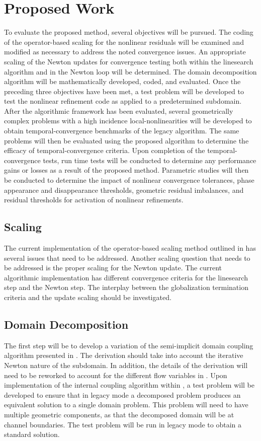 \chapter{Proposed Work}
\label{chap:proposal}
To evaluate the proposed method, several objectives will be pursued.
The coding of the operator-based scaling for the nonlinear residuals will be examined and modified as necessary to address the noted convergence issues.
An appropriate scaling of the Newton updates for convergence testing both within the linesearch algorithm and in the Newton loop will be determined.
The domain decomposition algorithm will be mathematically developed, coded, and evaluated.
Once the preceding three objectives have been met, a test problem will be developed to test the nonlinear refinement code as applied to a predetermined subdomain.
After the algorithmic framework has been evaluated, several geometrically complex problems with a high incidence local-nonlinearities will be developed to obtain temporal-convergence benchmarks of the legacy algorithm.
The same problems will then be evaluated using the proposed algorithm to determine the efficacy of temporal-convergence criteria.
Upon completion of the temporal-convergence tests, run time tests will be conducted to determine any performance gains or losses as a result of the proposed method.
Parametric studies will then be conducted to determine the impact of nonlinear convergence tolerances, phase appearance and disappearance thresholds, geometric residual imbalances, and residual thresholds for activation of nonlinear refinements.

\section{Scaling}
\label{sect:proposal_scaling}
The current implementation of the operator-based scaling method outlined in  has several issues that need to be addressed.
Another scaling question that needs to be addressed is the proper scaling for the Newton update.
The current algorithmic implementation has different convergence criteria for the linesearch step and the Newton step.
The interplay between the globalization termination criteria and the update scaling should be investigated. 

\section{Domain Decomposition}
\label{sect:domain_coupling}
The first step will be to develop a variation of the semi-implicit domain coupling algorithm presented in .
The derivation should take into account the iterative Newton nature of the subdomain. 
In addition, the details of the derivation will need to be reworked to account for the different flow variables in \cobra{}.
Upon implementation of the internal coupling algorithm within \cobra{}, a test problem will be developed to ensure that in legacy mode a decomposed problem produces an equivalent solution to a single domain problem.
This problem will need to have multiple geometric components, as that the decomposed domain will be at channel boundaries.
The test problem will be run in legacy mode to obtain a standard solution.

